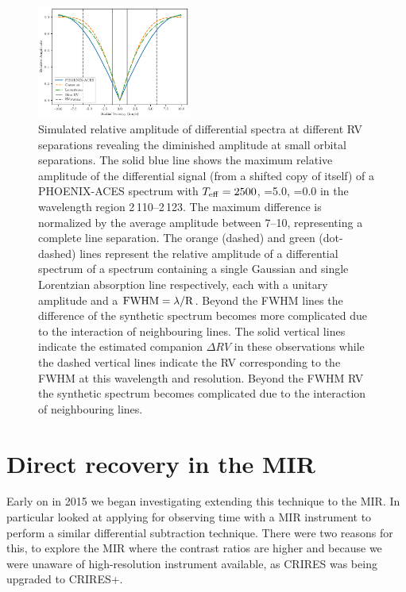 \begin{figure}
    \centering
    \includegraphics[width=0.45\textwidth]{figures/direct-recovery/rv_diff_final.pdf}
    \caption{Simulated relative amplitude of differential spectra at different {RV} separations revealing the diminished amplitude at small orbital separations. The solid blue line shows the maximum relative amplitude of the differential signal (from a shifted copy of itself) of a {PHOENIX-ACES} spectrum with \(T_{\mathrm{eff}}{}=2500\)\K{}, \logg{}=5.0, \feh{}=0.0 in the wavelength region 2\,110--2\,123\nm{}. The maximum difference is normalized by the average amplitude between 7--10\kmps{}, representing a complete line separation. The orange (dashed) and green (dot-dashed) lines represent the relative amplitude of a differential spectrum of a spectrum containing a single Gaussian and single Lorentzian absorption line respectively, each with a unitary amplitude and a \(\rm {FWHM} = \lambda / R\). Beyond the {FWHM} lines the difference of the synthetic spectrum becomes more complicated due to the interaction of neighbouring lines. The solid vertical lines indicate the estimated companion \(\Delta {RV}\) in these observations while the dashed vertical lines indicate the {RV} corresponding to the {FWHM} at this wavelength and resolution. Beyond the {FWHM} {RV} the synthetic spectrum becomes complicated due to the interaction of neighbouring lines.}
    \label{fig:diff_amp}
\end{figure}











\section{Direct recovery in the {MIR}}
Early on in 2015 we began investigating extending this technique to the {MIR}. In particular looked at applying for observing time with a {MIR} instrument to perform a similar differential subtraction technique.
There were two reasons for this, to explore the {MIR} where the contrast ratios are higher and because we were unaware of high-resolution \nir{} instrument available, as {CRIRES} was being upgraded to {CRIRES+}.

